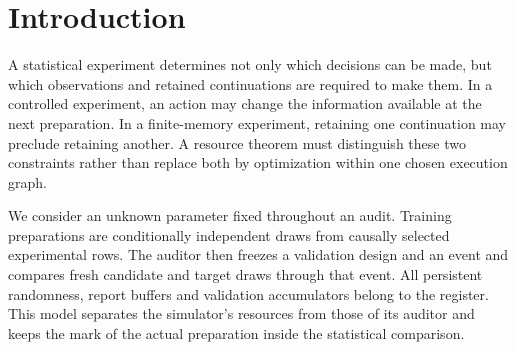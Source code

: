 \begin{abstract}
We study finite-resource statistical comparison when training operations
are chosen causally and a validation test is frozen before fresh candidate
and target preparations. For finite controlled experiments with a compact
parameter space, we prove an architecture-uniform posterior-predictive
dual in which action choice remains inside a Bellman recursion and the
adversarial prior is chosen only once. The actions need not be garblings
of a common experiment. We solve the one-preparation minimax problem
for a continuous family of marked product experiments, identifying both
an optimal response and a two-point least-favorable prior by an explicit
sum-of-squares identity. For the collision target the exact value is
$(85-7\sqrt{73})/64$. Combined with a deterministic two-preparation audit,
this gives an enlarged exact preparation segment at every peak width
at least twelve. The microscopic collision and positive-noise bridge
are proved within the article. A separate revelation family has the
exact joint law $(1-(1-\alpha)^N)(1-1/K)$ for preparations and decision
memory. Compatible finite-architecture certificates and a priced
classical autonomous comparison complete the resource analysis.
\end{abstract}
\maketitle
\tableofcontents

\section{Introduction}
A statistical experiment determines not only which decisions can be
made, but which observations and retained continuations are required to
make them. In a controlled experiment, an action may change the
information available at the next preparation. In a finite-memory
experiment, retaining one continuation may preclude retaining another.
A resource theorem must distinguish these two constraints rather than
replace both by optimization within one chosen execution graph.

We consider an unknown parameter fixed throughout an audit. Training
preparations are conditionally independent draws from causally selected
experimental rows. The auditor then freezes a validation design and an
event and compares fresh candidate and target draws through that event.
All persistent randomness, report buffers and validation accumulators
belong to the register. This model separates the simulator's resources
from those of its auditor and keeps the mark of the actual preparation
inside the statistical comparison.

